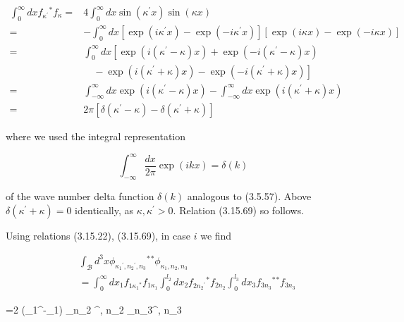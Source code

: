 \documentclass{article}
\begin{document}
\begin{align*}
\int_{0}^{\infty} d x f_{\kappa^{\prime}}{ }^{*} f_{\kappa}= & 4 \int_{0}^{\infty} d x \sin \left(\kappa^{\prime} x\right) \sin (\kappa x)  \tag{3.15.70}\\
= & -\int_{0}^{\infty} d x\left[\exp \left(i \kappa^{\prime} x\right)-\exp \left(-i \kappa^{\prime} x\right)\right][\exp (i \kappa x)-\exp (-i \kappa x)] \\
= & \int_{0}^{\infty} d x\left[\exp \left(i\left(\kappa^{\prime}-\kappa\right) x\right)+\exp \left(-i\left(\kappa^{\prime}-\kappa\right) x\right)\right. \\
& \left.\quad-\exp \left(i\left(\kappa^{\prime}+\kappa\right) x\right)-\exp \left(-i\left(\kappa^{\prime}+\kappa\right) x\right)\right] \\
= & \int_{-\infty}^{\infty} d x \exp \left(i\left(\kappa^{\prime}-\kappa\right) x\right)-\int_{-\infty}^{\infty} d x \exp \left(i\left(\kappa^{\prime}+\kappa\right) x\right) \\
= & 2 \pi\left[\delta\left(\kappa^{\prime}-\kappa\right)-\delta\left(\kappa^{\prime}+\kappa\right)\right]
\end{align*}
 
where we used the integral representation
 
\begin{equation*}
\int_{-\infty}^{\infty} \frac{d x}{2 \pi} \exp (i k x)=\delta(k) \tag{3.15.71}
\end{equation*}
 
of the wave number delta function $\delta(k)$ analogous to (3.5.57). Above $\delta\left(\kappa^{\prime}+\kappa\right)=0$ identically, as $\kappa, \kappa^{\prime}>0$. Relation (3.15.69) so follows.

Using relations (3.15.22), (3.15.69), in case $i$ we find
 
\begin{align*}
& \int_{\mathcal{B}} d^{3} x \phi_{\kappa_{1}{ }^{\prime}, n_{2}{ }^{\prime}, n_{3}}{ }^{*}{ }^{*} \phi_{\kappa_{1}, n_{2}, n_{3}}  \tag{3.15.72}\\
& =\int_{0}^{\infty} d x_{1} f_{1 \kappa_{1}{ }{ }^{*}} f_{1 \kappa_{1}} \int_{0}^{l_{2}} d x_{2} f_{2 n_{2}{ }^{\prime}}{ }^{*} f_{2 n_{2}} \int_{0}^{l_{3}} d x_{3} f_{3 n_{3}}{ }^{*}{ }^{*} f_{3 n_{3}}
\end{align*}
 
 
=2 \pi \delta\left(\kappa_{1}^{\prime}-\kappa_{1}\right) \delta_{n_{2}{ }^{\prime}, n_{2}} \delta_{n_{3}^{\prime}, n_{3}}
 
\end{document}
